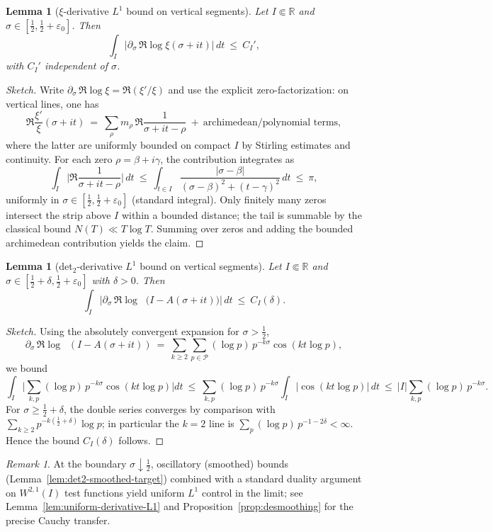 \documentclass[11pt]{article}
\newtheorem{lemma}[theorem]{Lemma}
\theoremstyle{definition}
\theoremstyle{remark}
\newtheorem{remark}[theorem]{Remark}
\newcommand{\R}{\mathbb{R}}
\newcommand{\PP}{\mathcal{P}}
\DeclareMathOperator{\dettwo}{det_2}
\begin{document}
\begin{lemma}[\(\xi\)-derivative $L^1$ bound on vertical segments]\label{lem:xi-deriv-L1}
Let $I\Subset\R$ and $\sigma\in[\tfrac12,\tfrac12+\varepsilon_0]$. Then
\[
 \int_I \Big|\partial_\sigma\,\Re\log\xi(\sigma+it)\Big|\,dt\ \le\ C_I',
\]
with $C_I'$ independent of $\sigma$.
\end{lemma}
\begin{proof}[Sketch]
Write \(\partial_\sigma\,\Re\log\xi=\Re(\xi'/\xi)\) and use the explicit zero-factorization: on vertical lines, one has
\[
 \Re\frac{\xi'}{\xi}(\sigma+it)\ =\ \sum_{\rho} m_\rho\,\Re\frac{1}{\sigma+it-\rho}\ +\ \text{archimedean/polynomial terms},
\]
where the latter are uniformly bounded on compact $I$ by Stirling estimates and continuity. For each zero \(\rho=\beta+i\gamma\), the contribution integrates as
\[\int_I \Big|\Re\frac{1}{\sigma+it-\rho}\Big|\,dt\ \le\ \int_{t\in I} \frac{|\sigma-\beta|}{(\sigma-\beta)^2+(t-\gamma)^2}\,dt\ \le\ \pi,
\]
uniformly in \(\sigma\in[\tfrac12,\tfrac12+\varepsilon_0]\) (standard integral). Only finitely many zeros intersect the strip above $I$ within a bounded distance; the tail is summable by the classical bound $N(T)\ll T\log T$. Summing over zeros and adding the bounded archimedean contribution yields the claim.
\end{proof}
\begin{lemma}[det$_2$-derivative $L^1$ bound on vertical segments]\label{lem:det2-deriv-L1}
Let $I\Subset\R$ and $\sigma\in[\tfrac12+\delta,\tfrac12+\varepsilon_0]$ with $\delta>0$. Then
\[
 \int_I \Big|\partial_\sigma\,\Re\log\dettwo\big(I-A(\sigma+it)\big)\Big|\,dt\ \le\ C_I(\delta).
\]
\end{lemma}
\begin{proof}[Sketch]
Using the absolutely convergent expansion for \(\sigma>\tfrac12\),
\[\partial_\sigma\,\Re\log\dettwo(I-A(\sigma+it))\ =\ \sum_{k\ge 2}\sum_{p\in\PP} (\log p)\,p^{-k\sigma}\cos(k t\log p),\]
we bound
\[\int_I \Big|\sum_{k,p}(\log p)\,p^{-k\sigma}\cos(k t\log p)\Big|dt\ \le\ \sum_{k,p}(\log p)\,p^{-k\sigma}\int_I |\cos(k t\log p)|\,dt\ \le\ |I|\sum_{k,p}(\log p)\,p^{-k\sigma}.
\]
For \(\sigma\ge \tfrac12+\delta\), the double series converges by comparison with \(\sum_{k\ge 2} p^{-k(\tfrac12+\delta)}\log p\); in particular the $k=2$ line is \(\sum_p (\log p)\,p^{-1-2\delta}<\infty\). Hence the bound $C_I(\delta)$ follows.
\end{proof}

\begin{remark}
At the boundary \(\sigma\downarrow \tfrac12\), oscillatory (smoothed) bounds (Lemma~\ref{lem:det2-smoothed-target}) combined with a standard duality argument on \(W^{2,1}(I)\) test functions yield uniform \(L^1\) control in the limit; see Lemma~\ref{lem:uniform-derivative-L1} and Proposition~\ref{prop:desmoothing} for the precise Cauchy transfer.
\end{remark}
\end{document}
